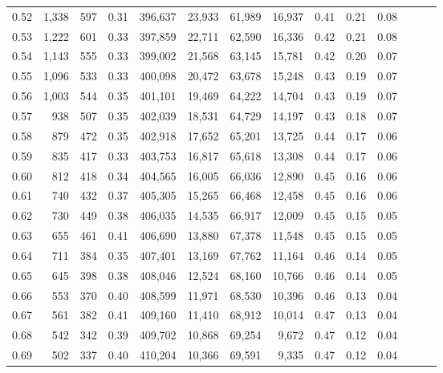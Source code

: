\begin{tabular}{rrrrrrrrrrrrrr}
0.52 &   1,338 &    597 &  0.31 &  396,637 &   23,933 &  61,989 &  16,937 &  0.41 &  0.21 &      0.08 \\
0.53 &   1,222 &    601 &  0.33 &  397,859 &   22,711 &  62,590 &  16,336 &  0.42 &  0.21 &      0.08 \\
0.54 &   1,143 &    555 &  0.33 &  399,002 &   21,568 &  63,145 &  15,781 &  0.42 &  0.20 &      0.07 \\
0.55 &   1,096 &    533 &  0.33 &  400,098 &   20,472 &  63,678 &  15,248 &  0.43 &  0.19 &      0.07 \\
0.56 &   1,003 &    544 &  0.35 &  401,101 &   19,469 &  64,222 &  14,704 &  0.43 &  0.19 &      0.07 \\
0.57 &     938 &    507 &  0.35 &  402,039 &   18,531 &  64,729 &  14,197 &  0.43 &  0.18 &      0.07 \\
0.58 &     879 &    472 &  0.35 &  402,918 &   17,652 &  65,201 &  13,725 &  0.44 &  0.17 &      0.06 \\
0.59 &     835 &    417 &  0.33 &  403,753 &   16,817 &  65,618 &  13,308 &  0.44 &  0.17 &      0.06 \\
0.60 &     812 &    418 &  0.34 &  404,565 &   16,005 &  66,036 &  12,890 &  0.45 &  0.16 &      0.06 \\
0.61 &     740 &    432 &  0.37 &  405,305 &   15,265 &  66,468 &  12,458 &  0.45 &  0.16 &      0.06 \\
0.62 &     730 &    449 &  0.38 &  406,035 &   14,535 &  66,917 &  12,009 &  0.45 &  0.15 &      0.05 \\
0.63 &     655 &    461 &  0.41 &  406,690 &   13,880 &  67,378 &  11,548 &  0.45 &  0.15 &      0.05 \\
0.64 &     711 &    384 &  0.35 &  407,401 &   13,169 &  67,762 &  11,164 &  0.46 &  0.14 &      0.05 \\
0.65 &     645 &    398 &  0.38 &  408,046 &   12,524 &  68,160 &  10,766 &  0.46 &  0.14 &      0.05 \\
0.66 &     553 &    370 &  0.40 &  408,599 &   11,971 &  68,530 &  10,396 &  0.46 &  0.13 &      0.04 \\
0.67 &     561 &    382 &  0.41 &  409,160 &   11,410 &  68,912 &  10,014 &  0.47 &  0.13 &      0.04 \\
0.68 &     542 &    342 &  0.39 &  409,702 &   10,868 &  69,254 &   9,672 &  0.47 &  0.12 &      0.04 \\
0.69 &     502 &    337 &  0.40 &  410,204 &   10,366 &  69,591 &   9,335 &  0.47 &  0.12 &      0.04 \\

\end{tabular}
